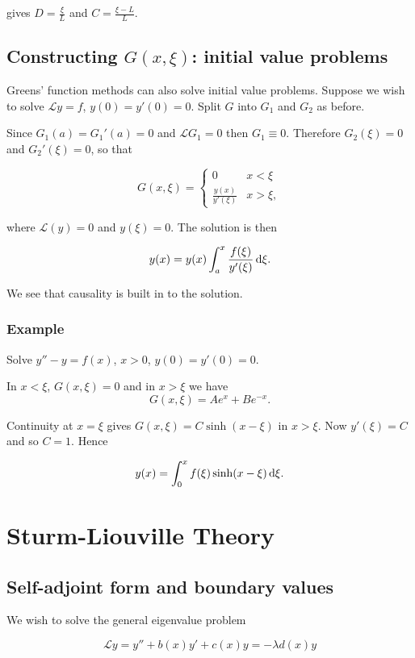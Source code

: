 \documentclass{notes}
\theoremstyle{plain}
\newcommand{\cL}{\mathcal{L}}
\begin{document}
gives $D = \frac{\xi}{L}$ and $C = \frac{\xi -L}{L}$.

\section{Constructing $G(x,\xi)$: initial value problems}

Greens' function methods can also solve initial value problems.
Suppose we wish to solve $\cL y = f$, $y(0) = y'(0) = 0$.  Split $G$
into $G_1$ and $G_2$ as before.

Since $G_1(a) = G_1'(a) = 0$ and $\cL G_1 = 0$ then $G_1 \equiv 0$.
Therefore $G_2(\xi) = 0$ and $G_2'(\xi) = 0$, so that

\[
G(x,\xi) = \begin{cases}
0 & x < \xi \\
\frac{y(x)}{y'(\xi)} & x > \xi,
\end{cases}
\]

where $\cL(y) = 0$ and $y(\xi) = 0$.  The solution is then

\[
y(x) = y(x) \int_a^x \frac{f(\xi)}{y'(\xi)}\, \mathrm{d} \xi.
\]

We see that causality is built in to the solution.

\subsection{Example}

Solve $y'' - y = f(x)$, $x > 0$, $y(0) = y'(0) = 0$.

In $x < \xi$, $G(x,\xi) = 0$ and in $x > \xi$ we have
\[
G(x,\xi) = A e^x + B e^{-x}.
\]

Continuity at $x = \xi$ gives $G(x,\xi) = C \sinh (x - \xi)$ in $x >
\xi$.  Now $y'(\xi) = C$ and so $C = 1$.  Hence

\[
y(x) = \int_0^x f(\xi) \sinh (x-\xi)\, \mathrm{d} \xi.
\] 

\chapter{Sturm-Liouville Theory}

\section{Self-adjoint form and boundary values}

We wish to solve the general eigenvalue problem

\begin{equation}\label{eq:geneig}
\cL y = y'' + b(x) y' + c(x) y = - \lambda d(x) y
\end{equation}
\end{document}
